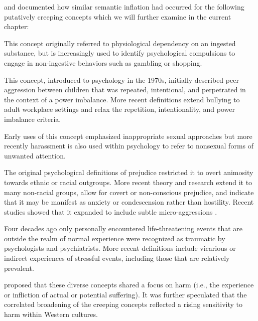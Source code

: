 \documentclass[output=paper]{langsci/langscibook}
\begin{document}
\citet{haslam2016concept} and \citet{haslam2020harm}  documented how similar semantic inflation had occurred for the following putatively creeping concepts which we will further examine in the current chapter: 


\begin{description}\sloppy
\item[Addiction:] This concept originally referred to physiological dependency on an ingested substance, but is increasingly used to identify psychological compulsions to engage in non-ingestive behaviors such as gambling or shopping.

\item[Bullying:] This concept, introduced to psychology in the 1970s, initially described peer aggression between children that was repeated, intentional, and perpetrated in the context of a power imbalance. More recent definitions extend bullying to adult workplace settings and relax the repetition, intentionality, and power imbalance criteria.

\item[Harassment:] Early uses of this concept emphasized inappropriate sexual approaches but more recently harassment is also used within psychology to refer to nonsexual forms of unwanted attention.

\item[Prejudice:] The original psychological definitions of prejudice restricted it to overt animosity towards ethnic or racial outgroups. More recent theory and research extend it to many non-racial groups, allow for covert or non-conscious prejudice, and indicate that it may be manifest as anxiety or condescension rather than hostility. Recent studies showed that it expanded to include subtle micro-aggressions \citep{lilienfeld2017microaggressions}.

\item[Trauma:] Four decades ago only personally encountered life-threatening events that are outside the realm of normal experience were recognized as traumatic by psychologists and psychiatrists. More recent definitions include vicarious or indirect experiences of stressful events, including those that are relatively prevalent.
\end{description}

\citet{haslam2016concept} proposed that these diverse concepts shared a focus on harm (i.e., the experience or infliction of actual or potential suffering). It was further speculated that the correlated broadening of the creeping concepts reflected a rising sensitivity to harm within Western cultures.
\end{document}
